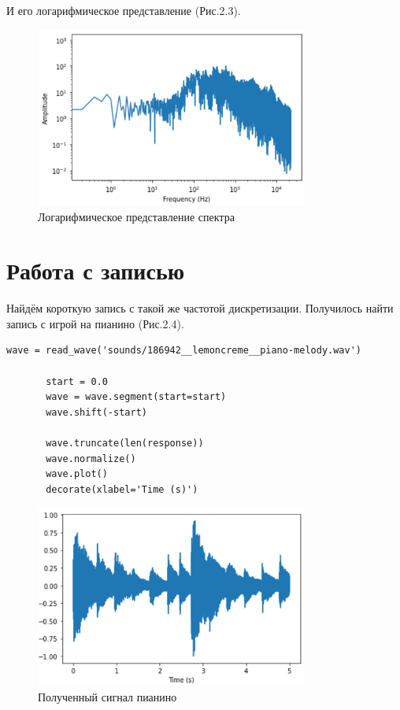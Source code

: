 \documentclass[a4paper,12pt]{report}
\begin{document}
    И его логарифмическое представление (Рис.2.3).
\begin{figure}[H]
        \centering
        \includegraphics[width=0.8\textwidth]{fig2-3.PNG}
        \caption{Логарифмическое представление спектра}
        \label{fig:fig2-3}
\end{figure}

\section{Работа с записью}
    
    Найдём короткую запись с такой же частотой дискретизации. Получилось найти запись с игрой на пианино (Рис.2.4).
\begin{lstlisting}[caption=Получение сигнала пианино]
       wave = read_wave('sounds/186942__lemoncreme__piano-melody.wav')

       start = 0.0
       wave = wave.segment(start=start)
       wave.shift(-start)

       wave.truncate(len(response))
       wave.normalize()
       wave.plot()
       decorate(xlabel='Time (s)')
\end{lstlisting}
\begin{figure}[H]
        \centering
        \includegraphics[width=0.8\textwidth]{fig2-4.PNG}
        \caption{Полученный сигнал пианино}
        \label{fig:fig2-4}
\end{figure}
\end{document}
